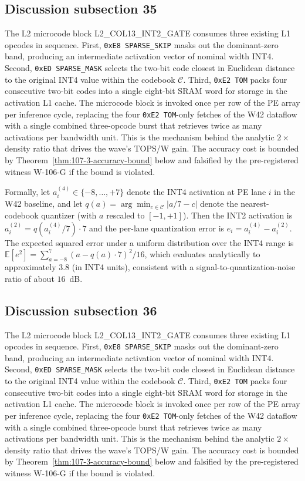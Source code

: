 \subsection{Discussion subsection 35}

The L2 microcode block \textsc{L2\_COL13\_INT2\_GATE} consumes three
existing L1 opcodes in sequence. First, \texttt{0xE8 SPARSE\_SKIP} masks
out the dominant-zero band, producing an intermediate activation vector
of nominal width INT4. Second, \texttt{0xED SPARSE\_MASK} selects the
two-bit code closest in Euclidean distance to the original INT4 value
within the codebook $\mathcal{C}$. Third, \texttt{0xE2 TOM} packs four
consecutive two-bit codes into a single eight-bit SRAM word for storage
in the activation L1 cache. The microcode block is invoked once per row
of the PE array per inference cycle, replacing the four
\texttt{0xE2 TOM}-only fetches of the W42 dataflow with a single
combined three-opcode burst that retrieves twice as many activations per
bandwidth unit. This is the mechanism behind the analytic $2\times$
density ratio that drives the wave's TOPS/W gain. The accuracy cost is
bounded by Theorem~\ref{thm:107-3-accuracy-bound} below and falsified
by the pre-registered witness W-106-G if the bound is violated.

Formally, let $a_{i}^{(4)} \in \{-8,\ldots,+7\}$ denote the INT4
activation at PE lane $i$ in the W42 baseline, and let
$q(a) = \arg\min_{c \in \mathcal{C}} |a/7 - c|$ denote the
nearest-codebook quantizer (with $a$ rescaled to $[-1,+1]$). Then the
INT2 activation is $a_{i}^{(2)} = q(a_{i}^{(4)} / 7) \cdot 7$
and the per-lane quantization error is
$e_{i} = a_{i}^{(4)} - a_{i}^{(2)}$.
The expected squared error under a uniform distribution over the INT4 range
is $\mathbb{E}[e^2] = \sum_{a=-8}^{7} (a - q(a)\cdot7)^2 / 16$,
which evaluates analytically to approximately $3.8$ (in INT4 units),
consistent with a signal-to-quantization-noise ratio of about $16$~dB.


\subsection{Discussion subsection 36}

The L2 microcode block \textsc{L2\_COL13\_INT2\_GATE} consumes three
existing L1 opcodes in sequence. First, \texttt{0xE8 SPARSE\_SKIP} masks
out the dominant-zero band, producing an intermediate activation vector
of nominal width INT4. Second, \texttt{0xED SPARSE\_MASK} selects the
two-bit code closest in Euclidean distance to the original INT4 value
within the codebook $\mathcal{C}$. Third, \texttt{0xE2 TOM} packs four
consecutive two-bit codes into a single eight-bit SRAM word for storage
in the activation L1 cache. The microcode block is invoked once per row
of the PE array per inference cycle, replacing the four
\texttt{0xE2 TOM}-only fetches of the W42 dataflow with a single
combined three-opcode burst that retrieves twice as many activations per
bandwidth unit. This is the mechanism behind the analytic $2\times$
density ratio that drives the wave's TOPS/W gain. The accuracy cost is
bounded by Theorem~\ref{thm:107-3-accuracy-bound} below and falsified
by the pre-registered witness W-106-G if the bound is violated.

